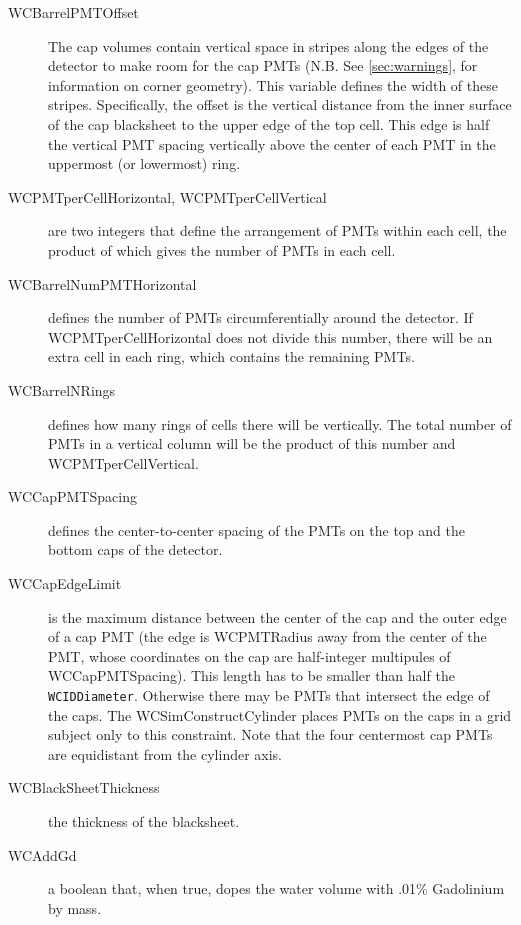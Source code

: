 \begin{description}
\item[WCBarrelPMTOffset] The cap volumes contain vertical space in stripes along the edges of the detector to make room for the cap PMTs (N.B.  See \ref{sec:warnings}, for information on corner geometry). This variable defines the width of these stripes.  Specifically, the offset is the vertical distance from the inner surface of the cap blacksheet to the upper edge of the top cell.  This edge is half the vertical PMT spacing vertically above the center of each PMT in the uppermost (or lowermost) ring.

\item[WCPMTperCellHorizontal, WCPMTperCellVertical] are two integers that define the arrangement of PMTs within each cell, the product of which gives the number of PMTs in each cell.

\item[WCBarrelNumPMTHorizontal] defines the number of PMTs circumferentially around the detector. If WCPMTperCellHorizontal does not divide this number, there will be an extra cell in each ring, which contains the remaining PMTs.

\item[WCBarrelNRings] defines how many rings of cells there will be vertically.  The total number of PMTs in a vertical column will be the product of this number and WCPMTperCellVertical.

\item[WCCapPMTSpacing] defines the center-to-center spacing of the PMTs on the top and the bottom caps of the detector.

\item[WCCapEdgeLimit] is the maximum distance between the center of the cap and the outer edge of a cap PMT (the edge is WCPMTRadius away from the center of the PMT, whose coordinates on the cap are half-integer multipules of WCCapPMTSpacing). This length has to be smaller than half the \texttt{WCIDDiameter}. Otherwise there may be PMTs that intersect the edge of the caps.  The WCSimConstructCylinder places PMTs on the caps in a grid subject only to this constraint.  Note that the four centermost cap PMTs are equidistant from the cylinder axis.

\item[WCBlackSheetThickness] the thickness of the blacksheet.

\item[WCAddGd] a boolean that, when true, dopes the water volume with .01\% Gadolinium by mass.
\end {description}


